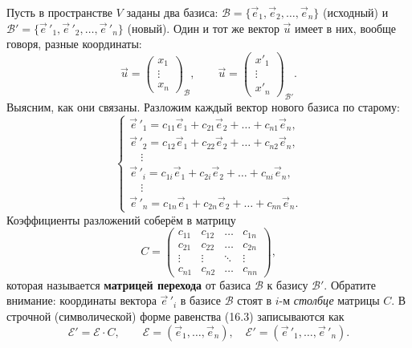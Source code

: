 \documentclass[12pt,a4paper]{article}
\begin{document}
Пусть в пространстве $V$ заданы два базиса:
$\mathcal{B} = \{\vec{e}_1, \vec{e}_2, \dots, \vec{e}_n\}$ (исходный)
и \\$\mathcal{B}' = \{\vec{e}\,'_1, \vec{e}\,'_2, \dots,
\vec{e}\,'_n\}$ (новый).
Один и тот же вектор $\vec{u}$ имеет в них, вообще \\ говоря, разные координаты:
\[
  \vec{u} =
  \begin{pmatrix} x_1 \\ \vdots \\ x_n
  \end{pmatrix}_{\mathcal{B}},
  \qquad
  \vec{u} =
  \begin{pmatrix} x'_1 \\ \vdots \\ x'_n
  \end{pmatrix}_{\mathcal{B}'}.
\]
Выясним, как они связаны. Разложим каждый вектор нового базиса по
старому:
\begin{equation}
  \begin{cases}
    \vec{e}\,'_1 = c_{11}\vec{e}_1 + c_{21}\vec{e}_2 + \dots +
    c_{n1}\vec{e}_n, \\
    \vec{e}\,'_2 = c_{12}\vec{e}_1 + c_{22}\vec{e}_2 + \dots +
    c_{n2}\vec{e}_n, \\
    \quad \vdots \\
    \vec{e}\,'_i = c_{1i}\vec{e}_1 + c_{2i}\vec{e}_2 + \dots +
    c_{ni}\vec{e}_n, \\
    \quad \vdots \\
    \vec{e}\,'_n = c_{1n}\vec{e}_1 + c_{2n}\vec{e}_2 + \dots +
    c_{nn}\vec{e}_n.
  \end{cases}
  \tag{16.3}
\end{equation}
Коэффициенты разложений соберём в матрицу
\[
  C =
  \begin{pmatrix}
    c_{11} & c_{12} & \dots & c_{1n} \\
    c_{21} & c_{22} & \dots & c_{2n} \\
    \vdots & \vdots & \ddots & \vdots \\
    c_{n1} & c_{n2} & \dots & c_{nn}
  \end{pmatrix},
\]
которая называется \textbf{матрицей перехода} от базиса
$\mathcal{B}$ к базису $\mathcal{B}'$. Обратите внимание: координаты
вектора $\vec{e}\,'_i$ в базисе $\mathcal{B}$ стоят в $i$-м
\emph{столбце} матрицы $C$. В строчной (символической) форме равенства
(16.3) записываются как
\begin{equation}
  \mathcal{E}' = \mathcal{E} \cdot C, \qquad
  \mathcal{E} = (\vec{e}_1, \dots, \vec{e}_n), \quad
  \mathcal{E}' = (\vec{e}\,'_1, \dots, \vec{e}\,'_n).
  \tag{16.4}
\end{equation}
\end{document}
